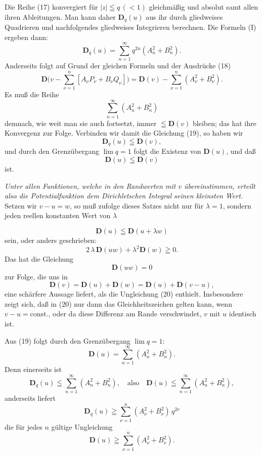 \documentclass{article}
\begin{document}
Die Reihe (17) konvergiert für $|z| \leqq q\,(< 1)$ gleichmäßig und absolut samt allen ihren Ableitungen. Man kann daher $\mathbf{D}_q(u)$ aus ihr durch gliedweises Quadrieren und nachfolgendes gliedweises Integrieren berechnen. Die Formeln (I) ergeben dann:
\[ \mathbf{D}_q(u) = \sum_{n=1}^\infty q^{2n}(A_n^2 + B_n^2). \tag{19} \]
Anderseits folgt auf Grund der gleichen Formeln und der Ausdrücke (18)
\[ \mathbf{D}\Big( v - \sum_{\nu=1}^n [A_\nu P_\nu + B_\nu Q_\nu] \Big) = \mathbf{D}(v) - \sum_{\nu=1}^n (A_\nu^2 + B_\nu^2). \]
Es muß die Reihe
\[ \sum_{n=1}^\infty (A_n^2 + B_n^2) \]
demnach, wie weit man sie auch fortsetzt, immer $\leqq \mathbf{D}(v)$ bleiben; das hat ihre Konvergenz zur Folge. Verbinden wir damit die Gleichung (19), so haben wir
\[ \mathbf{D}_q(u) \leqq \mathbf{D}(v), \]
und durch den Grenzübergang $\lim q = 1$ folgt die Existenz von $\mathbf{D}(u)$, und daß
\[ \mathbf{D}(u) \leqq \mathbf{D}(v) \tag{20} \]
ist.

\emph{Unter allen Funktionen, welche in den Randwerten mit $v$ übereinstimmen, erteilt also die Potentialfunktion dem Dirichletschen Integral seinen kleinsten Wert.} Setzen wir $v - u = w$, so muß zufolge dieses Satzes nicht nur für $\lambda = 1$, sondern jeden reellen konstanten Wert von $\lambda$

\[ \mathbf{D}(u) \leqq \mathbf{D}(u + \lambda w) \]
sein, oder anders geschrieben:
\[ 2\,\lambda\,\mathbf{D}(uw) + \lambda^2 \mathbf{D}(w) \geqq 0. \]
Das hat die Gleichung
\[ \mathbf{D}(uw) = 0 \]
zur Folge, die uns in
\[ \mathbf{D}(v) = \mathbf{D}(u) + \mathbf{D}(w) = \mathbf{D}(u) + \mathbf{D}(v - u), \]
eine schärfere Aussage liefert, als die Ungleichung (20) enthielt. Insbesondere zeigt sich, daß in (20) nur dann das Gleichheitszeichen gelten kann, wenn $v - u = \mathrm{const.}$, oder da diese Differenz am Rande verschwindet, $v$ mit $u$ identisch ist.

Aus (19) folgt durch den Grenzübergang $\lim q = 1$:
\[ \mathbf{D}(u) = \sum_{n=1}^\infty (A_n^2 + B_n^2). \tag{21} \]
Denn einerseits ist
\[ \mathbf{D}_q(u) \leqq \sum_{n=1}^\infty (A_n^2 + B_n^2), \quad \text{also} \quad \mathbf{D}(u) \leqq \sum_{n=1}^\infty (A_n^2 + B_n^2), \]
anderseits liefert
\[ \mathbf{D}_q(u) \geqq \sum_{\nu=1}^n (A_\nu^2 + B_\nu^2)\,q^{2\nu} \]
die für jedes $n$ gültige Ungleichung
\[ \mathbf{D}(u) \geqq \sum_{\nu=1}^n (A_\nu^2 + B_\nu^2). \]
\end{document}
